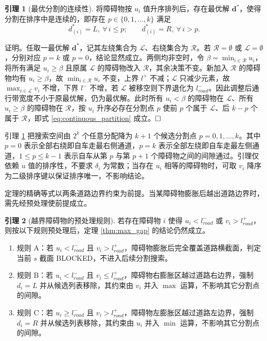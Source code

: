 \documentclass[a4paper,11pt]{ctexart}
\theoremstyle{definition}
\newtheorem{lemma}{引理}[section]
\begin{document}
\begin{lemma}[最优分割的连续性]
\label{lem:continuous_partition}
将障碍物按 $u_i$ 值升序排列后，存在最优解 $\mathbf{d}^{*}$，使得分割在排序中是连续的，即存在 $p \in \{0, 1, \ldots, k\}$ 满足
\begin{equation}
    d_{(i)}^{*} = L,\ \forall\, i \leq p; \qquad d_{(i)}^{*} = R,\ \forall\, i > p.
    \label{eq:continuous_partition}
\end{equation}
\end{lemma}

证明。任取一最优解 $\mathbf{d}^{*}$，记其左绕集合为 $\mathcal{L}$、右绕集合为 $\mathcal{R}$。若 $\mathcal{R}=\emptyset$ 或 $\mathcal{L}=\emptyset$，分别对应 $p=k$ 或 $p=0$，结论显然成立。两侧均非空时，令 $\beta = \min_{i \in \mathcal{R}} u_i$，将所有满足 $u_i \geq \beta$ 且原属 $\mathcal{L}$ 的障碍物改入 $\mathcal{R}$，其余决策不变。新加入 $\mathcal{R}$ 的障碍物均有 $u_i \geq \beta$，故 $\min_{i \in \mathcal{R}} u_i$ 不变，上界 $l^{+}$ 不减；$\mathcal{L}$ 只减少元素，故 $\max_{i \in \mathcal{L}} v_i$ 不增，下界 $l^{-}$ 不增，若 $\mathcal{L}$ 被移空则下界退化为 $l_{road}^{-}$。因此调整后通行带宽度不小于原最优解，仍为最优解。此时所有 $u_i < \beta$ 的障碍物在 $\mathcal{L}$、所有 $u_i \geq \beta$ 的障碍物在 $\mathcal{R}$，按 $u_i$ 升序必存在分割点 $p$ 使前 $p$ 个属于 $\mathcal{L}$、后 $k-p$ 个属于 $\mathcal{R}$，即式 \eqref{eq:continuous_partition} 成立。$\hfill\Box$

引理 \ref{lem:continuous_partition} 把搜索空间由 $2^k$ 个任意分配降为 $k+1$ 个候选分割点 $p = 0, 1, \ldots, k$。其中 $p=0$ 表示全部右绕即自车走最右侧通道，$p=k$ 表示全部左绕即自车走最左侧通道，$1 \leq p \leq k-1$ 表示自车从第 $p$ 与第 $p+1$ 个障碍物之间的间隙通过。引理仅依赖 $u$ 值的排序性，不要求 $\delta_i$ 为常数；当存在 $u_i$ 相等的障碍物时，可取 $v_i$ 降序为二级排序键以保证排序唯一，不影响结论。

定理的精确等式以两条道路边界约束为前提。当某障碍物膨胀后越出道路边界时，需先经预处理使前提成立。

\begin{lemma}[越界障碍物的预处理规则]
\label{lem:boundary_trim}
若存在障碍物 $i$ 使得 $u_i < l_{road}^{-}$ 或 $v_i > l_{road}^{+}$，则按以下规则预处理后，定理 \ref{thm:max_gap} 的结论仍然成立。
\begin{enumerate}
    \item 规则 A：若 $u_i < l_{road}^{-}$ 且 $v_i > l_{road}^{+}$，障碍物膨胀后完全覆盖道路横截面，判定当前 $s$ 截面 BLOCKED，不进入后续分割搜索。
    \item 规则 B：若 $u_i < l_{road}^{-}$ 且 $v_i \leq l_{road}^{+}$，障碍物右膨胀区越过道路右边界，强制 $d_i = L$ 并从候选列表移除，其约束由 $v_i$ 并入 $\max$ 运算，不影响其它分割点的间隙。
    \item 规则 C：若 $u_i \geq l_{road}^{-}$ 且 $v_i > l_{road}^{+}$，障碍物左膨胀区越过道路左边界，强制 $d_i = R$ 并从候选列表移除，其约束由 $u_i$ 并入 $\min$ 运算，不影响其它分割点的间隙。
\end{enumerate}
\end{lemma}
\end{document}
